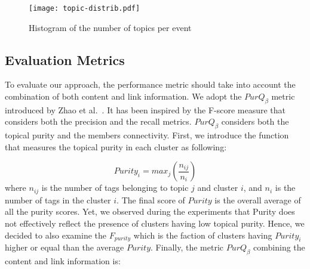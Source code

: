 \begin{table}[H]
\end{table}


\begin{figure}[H]
  \centering
  \texttt{[image: topic-distrib.pdf]}
  \caption{Histogram of the number of topics per event}
  \label{fig:event-topic}
\end{figure}


\subsection{Evaluation Metrics}
To evaluate our approach, the performance metric should take into account the combination of both content and link information. We adopt the $PurQ_\beta$ metric introduced by Zhao et al.~\cite{Zhongying:12}. It has been inspired by the F-score measure that considers both the precision and the recall metrics. $PurQ_\beta$ considers both the topical purity and the members connectivity. First, we introduce the function that measures the topical purity in each cluster as following:

\begin{equation}    \label{eq:purity}
     Purity_i= max_j \left( \frac{n_{ij}}{n_i} \right)
\end{equation}
where $n_{ij}$ is the number of tags belonging to topic $j$ and cluster $i$, and $n_i$ is the number of tags in the cluster $i$. The final score of $Purity$ is the overall average of all the purity scores. Yet, we observed during the experiments that Purity does not effectively reflect the presence of clusters having low topical purity. Hence, we decided to also examine the $F_{purity}$ which is the faction of clusters having $Purity_i$ higher or equal than the average $Purity$. Finally, the metric $PurQ_\beta$ combining the content and link information is:


